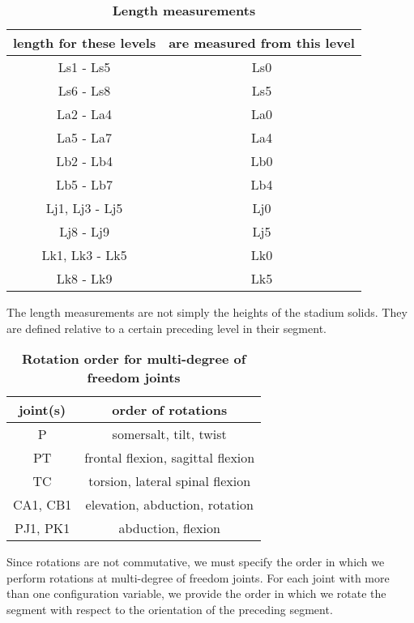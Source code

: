 \documentclass[10pt]{article}
\begin{document}
\begin{table}[!ht]
\caption{
\bf{Length measurements}}
\begin{tabular}{|c|c|}
    \hline
    \textbf{length for these levels} & \textbf{are measured from this level}\\
    \hline
    Ls1 - Ls5 & Ls0 \\
    \hline
    Ls6 - Ls8 & Ls5 \\
    \hline
    La2 - La4 & La0 \\
    \hline
    La5 - La7 & La4 \\
    \hline
    Lb2 - Lb4 & Lb0 \\
    \hline
    Lb5 - Lb7 & Lb4 \\
    \hline
    Lj1, Lj3 - Lj5 & Lj0 \\
    \hline
    Lj8 - Lj9 & Lj5  \\
    \hline
    Lk1, Lk3 - Lk5 & Lk0 \\
    \hline
    Lk8 - Lk9 & Lk5  \\
    \hline
\end{tabular}
\begin{flushleft}The length measurements are not simply the heights of the
    stadium solids. They are defined relative to a certain preceding level in
    their segment.
\end{flushleft}
\label{tab:length}
\end{table}

\begin{table}[!ht]
\caption{
\bf{Rotation order for multi-degree of freedom joints}}
\begin{tabular}{|c|c|}
    \hline
    \textbf{joint(s)} & \textbf{order of rotations}\\
    \hline
    P & somersalt, tilt, twist \\
    \hline
    PT & frontal flexion, sagittal flexion \\
    \hline
    TC & torsion, lateral spinal flexion \\
    \hline
    CA1, CB1 & elevation, abduction, rotation \\
    \hline
    PJ1, PK1 & abduction, flexion \\
    \hline
\end{tabular}
\begin{flushleft}Since rotations are not commutative, we must specify the order
    in which we perform rotations at multi-degree of freedom joints. For each
    joint with more than one configuration variable, we provide the order in
    which we rotate the segment with respect to the orientation of the
    preceding segment.
\end{flushleft}
\label{tab:dof}
\end{table}
\end{document}
